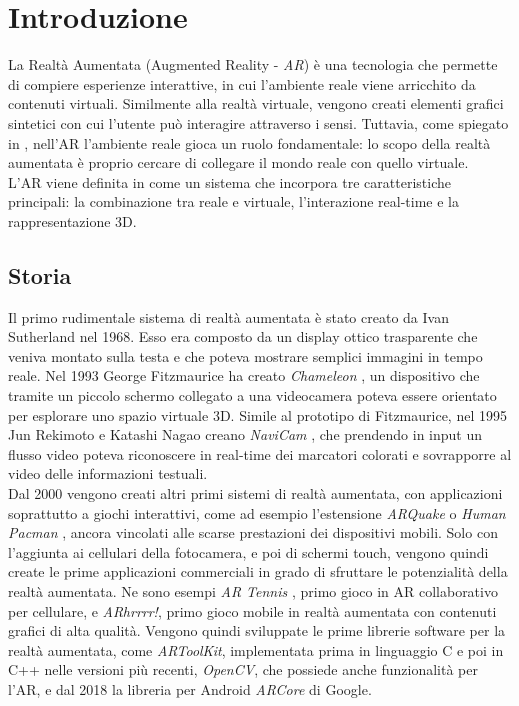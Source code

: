 \documentclass[crop=false, class=book]{standalone}
\begin{document}
	\chapter{Introduzione}
	La Realtà Aumentata (Augmented Reality - \emph{AR}) è una tecnologia che permette di compiere esperienze interattive, in cui l'ambiente reale viene arricchito da contenuti virtuali. Similmente alla realtà virtuale, vengono creati elementi grafici sintetici con cui l'utente può interagire attraverso i sensi. Tuttavia, come spiegato in \cite{bimber2005spatial}, nell'AR l'ambiente reale gioca un ruolo fondamentale: lo scopo della realtà aumentata è proprio cercare di collegare il mondo reale con quello virtuale.
	\\
	L'AR viene definita in \cite{azuma1997survey} come un sistema che incorpora tre caratteristiche principali: la combinazione tra reale e virtuale, l'interazione real-time e la rappresentazione 3D. 
	
	\section{Storia}
	Il primo rudimentale sistema di realtà aumentata è stato creato da Ivan Sutherland \cite{sutherland1968head} nel 1968. Esso era composto da un display ottico trasparente che veniva montato sulla testa e che poteva mostrare semplici immagini in tempo reale. Nel 1993 George Fitzmaurice ha creato \textit{Chameleon} \cite{fitzmaurice1993situated}, un dispositivo che tramite un piccolo schermo collegato a una videocamera poteva essere orientato per esplorare uno spazio virtuale 3D. Simile al prototipo di Fitzmaurice, nel 1995 Jun Rekimoto e Katashi Nagao creano \textit{NaviCam} \cite{rekimoto1995world}, che prendendo in input un flusso video poteva riconoscere in real-time dei marcatori colorati e sovrapporre al video delle informazioni testuali. 
	\\
	Dal 2000 vengono creati altri primi sistemi di realtà aumentata, con applicazioni soprattutto a giochi interattivi, come ad esempio l'estensione \textit{ARQuake} \cite{thomas2000arquake} o \textit{Human Pacman} \cite{cheok2003human}, ancora vincolati alle scarse prestazioni dei dispositivi mobili. Solo con l'aggiunta ai cellulari della fotocamera, e poi di schermi touch, vengono quindi create le prime applicazioni commerciali in grado di sfruttare le potenzialità della realtà aumentata. Ne sono esempi \textit{AR Tennis} \cite{henrysson2006ARtennis}, primo gioco in AR collaborativo per cellulare, e \textit{ARhrrrr!}, primo gioco mobile in realtà aumentata con contenuti grafici di alta qualità. Vengono quindi sviluppate le prime librerie software per la realtà aumentata, come \textit{ARToolKit}, implementata prima in linguaggio C e poi in C++ nelle versioni più recenti, \textit{OpenCV}, che possiede anche funzionalità per l'AR, e dal 2018 la libreria per Android \textit{ARCore} di Google.
	
\end{document}
